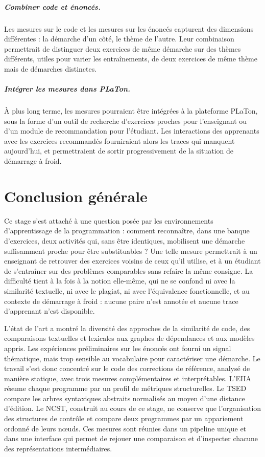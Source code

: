 \documentclass[12pt,a4paper,oneside]{report}
\begin{document}
\paragraph{Combiner code et énoncés.}
Les mesures sur le code et les mesures sur les énoncés capturent des
dimensions différentes : la démarche d'un côté, le thème de l'autre. Leur
combinaison permettrait de distinguer deux exercices de même démarche sur
des thèmes différents, utiles pour varier les entraînements, de deux
exercices de même thème mais de démarches distinctes.

\paragraph{Intégrer les mesures dans PLaTon.}
À plus long terme, les mesures pourraient être intégrées à la plateforme
PLaTon, sous la forme d'un outil de recherche d'exercices proches pour
l'enseignant ou d'un module de recommandation pour l'étudiant. Les
interactions des apprenants avec les exercices recommandés fourniraient
alors les traces qui manquent aujourd'hui, et permettraient de sortir
progressivement de la situation de démarrage à froid.

\chapter*{Conclusion générale}

Ce stage s'est attaché à une question posée par les environnements
d'apprentissage de la programmation : comment reconnaître, dans une banque
d'exercices, deux activités qui, sans être identiques, mobilisent une
démarche suffisamment proche pour être substituables ? Une telle mesure
permettrait à un enseignant de retrouver des exercices voisins de ceux
qu'il utilise, et à un étudiant de s'entraîner sur des problèmes
comparables sans refaire la même consigne. La difficulté tient à la fois à
la notion elle-même, qui ne se confond ni avec la similarité textuelle, ni
avec le plagiat, ni avec l'équivalence fonctionnelle, et au contexte de
démarrage à froid : aucune paire n'est annotée et aucune trace
d'apprenant n'est disponible.

L'état de l'art a montré la diversité des approches de la similarité de
code, des comparaisons textuelles et lexicales aux graphes de dépendances
et aux modèles appris. Les expériences préliminaires sur les énoncés ont
fourni un signal thématique, mais trop sensible au vocabulaire pour
caractériser une démarche. Le travail s'est donc concentré sur le code des
corrections de référence, analysé de manière statique, avec trois mesures
complémentaires et interprétables. L'EIIA résume chaque programme par un
profil de métriques structurelles. Le TSED compare les arbres syntaxiques
abstraits normalisés au moyen d'une distance d'édition. Le NCST, construit
au cours de ce stage, ne conserve que l'organisation des structures de
contrôle et compare deux programmes par un appariement ordonné de leurs
nœuds. Ces mesures sont réunies dans un pipeline unique et dans une
interface qui permet de rejouer une comparaison et d'inspecter chacune des
représentations intermédiaires.
\end{document}
